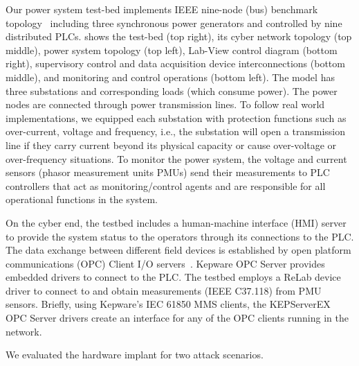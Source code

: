 Our power system test-bed implements IEEE nine-node (bus) benchmark topology~\cite{christie2000power} including three synchronous power generators and controlled by nine distributed PLCs.  shows the test-bed (top right), its cyber network topology (top middle), power system topology (top left), Lab-View control diagram (bottom right), supervisory control and data acquisition device interconnections (bottom middle), and monitoring and control operations (bottom left). The model has three substations and corresponding loads (which consume power). The power nodes are connected through power transmission lines. To follow real world implementations, we equipped each substation with protection functions such as over-current, voltage and frequency, i.e., the substation will open a transmission line if they carry current beyond its physical capacity or cause over-voltage or over-frequency situations. To monitor the power system, the voltage and current sensors (phasor measurement units PMUs) send their measurements to PLC controllers that act as monitoring/control agents and are responsible for all operational functions in the system. 

On the cyber end, the testbed includes a human-machine interface (HMI) server to provide the system status to the operators through its connections to the PLC. The data exchange between different field devices is established by open platform communications (OPC) Client I/O servers~\cite{opc}. Kepware OPC Server provides embedded drivers to connect to the PLC. The testbed employs a ReLab device driver to connect to and obtain measurements (IEEE C37.118) from PMU sensors. Briefly, using Kepware’s IEC 61850 MMS clients, the KEPServerEX OPC Server drivers create an interface for any of the OPC clients running in the network. 

We evaluated the hardware implant for two attack scenarios. 

